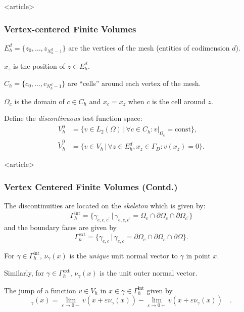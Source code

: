 \begin{frame}<article>
\frametitle<presentation>{Vertex-centered Finite Volumes}
\begin{window}
$E_h^d=\{z_0,\ldots,z_{N_h^d-1}\}$ are the vertices of the mesh
(entities of codimension $d$). 

$x_z$ is the position of $z\in E_h^d$.

$C_h = \{c_0,\ldots,c_{N_h^d-1}\}$ are ``cells'' around each vertex of
the mesh.
\end{window}

$\Omega_c$ is the domain of $c\in C_h$ and $x_c=x_z$ when $c$ is the
cell around $z$.

Define the \textit{discontinuous} test function space:
\begin{align*}
V_h^0 & = \{ v\in L_2(\Omega) \,|\, \forall c\in C_h : v|_{\Omega_c} =
\text{const} \},\\
\tilde{V}_h^0 &= \{ v\in V_h \,|\, \forall z\in E_h^d, x_z\in\Gamma_D : v(x_z)=0\}.
\end{align*}

\end{frame}

\begin{frame}<article>
\frametitle<presentation>{Vertex Centered Finite Volumes (Contd.)}
The discontinuities are located on the \textit{skeleton} which is given by:
\begin{equation*}
\Gamma_h^{\text{int}} = \{\gamma_{e,c,c^\prime} \,|\,
\gamma_{e,c,c^\prime} = \Omega_e \cap \partial\Omega_c \cap
\partial\Omega_{c^\prime} \}
\end{equation*}
and the boundary faces are given by
\begin{equation*}
\Gamma_h^{\text{ext}} = \{\gamma_{e,c} \,|\,
\gamma_{e,c} = \partial\Omega_e \cap \partial\Omega_c \cap
\partial\Omega \}.
\end{equation*}

For $\gamma\in\Gamma_h^{\text{int}}$, $\nu_\gamma(x)$ is
the \textit{unique} unit
normal vector to $\gamma$ in point $x$. 

Similarly, for
$\gamma\in\Gamma_h^{\text{ext}}$, $\nu_\gamma(x)$ is the unit outer
normal vector.

The jump of a function $v\in V_h$ in
$x\in\gamma\in\Gamma_h^{\text{int}}$ given by
\begin{equation*}
[v]_\gamma(x) = \lim_{\varepsilon\to 0-} v(x+\varepsilon \nu_\gamma(x))
-  \lim_{\varepsilon\to 0+} v(x+\varepsilon \nu_\gamma(x))\quad.
\end{equation*}
\end{frame}

